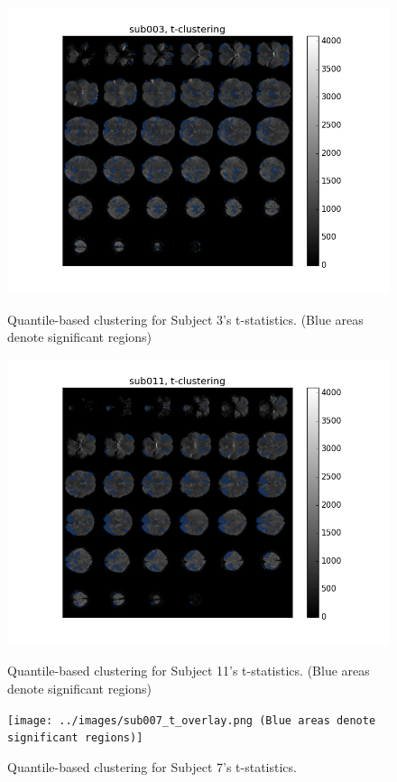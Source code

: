 \begin{figure}[ht]
\centering
\begin{minipage}[b]{0.45\linewidth}
	\centering
	\includegraphics[width=.8\linewidth]{../images/sub003_t_overlay.png} 
	\caption{Quantile-based clustering for Subject 3's t-statistics. 
	(Blue areas denote significant regions)}
	\label{fig:clustersub3}
\end{minipage}	

\begin{minipage}[b]{0.45\linewidth}
	\centering
		\includegraphics[width=.8\linewidth]{../images/sub011_t_overlay.png} 
	\caption{Quantile-based clustering for Subject 11's t-statistics. 
	(Blue areas denote significant regions)}
	\label{fig:clustersub11}
\end{minipage}

\begin{minipage}[b]{0.45\linewidth}
	\centering
		\texttt{[image: ../images/sub007\_t\_overlay.png 
		(Blue areas denote significant regions)]} 
	\caption{Quantile-based clustering for Subject 7's t-statistics.}
	\label{fig:clustersub7}
\end{minipage}
\end{figure}




